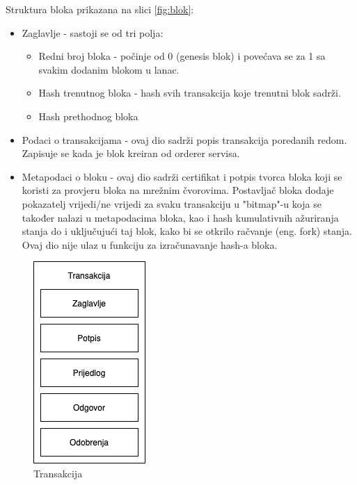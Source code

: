\documentclass[times, utf8, diplomski]{fer}
\begin{document}
Struktura bloka prikazana na slici \ref{fig:blok}:
\begin{itemize}
\item Zaglavlje - sastoji se od tri polja:
	\begin{itemize}
		\item Redni broj bloka - počinje od 0 (genesis blok) i povećava se za 1 sa svakim dodanim blokom u lanac.
		\item Hash trenutnog bloka - hash svih transakcija koje trenutni blok sadrži.
		\item Hash prethodnog bloka
	\end{itemize}

\item Podaci o transakcijama - ovaj dio sadrži popis transakcija poredanih redom. Zapisuje se kada je blok kreiran od orderer servisa.
\item Metapodaci o bloku - ovaj dio sadrži certifikat i potpis tvorca bloka koji se koristi za provjeru bloka na mrežnim čvorovima.  Postavljač bloka dodaje pokazatelj vrijedi/ne vrijedi za svaku transakciju u "bitmap"-u koja se također nalazi u metapodacima bloka,  kao i hash kumulativnih ažuriranja stanja do i uključujući taj blok,  kako bi se otkrilo račvanje (eng. fork) stanja.  Ovaj dio nije ulaz u funkciju za izračunavanje hash-a bloka.
\end{itemize}

\begin{figure}[htb]
\centering
\includegraphics[scale=0.5]{imgs/Transakcija.png}
\caption{Transakcija}
\label{fig:transakcija}
\end{figure}
\end{document}
